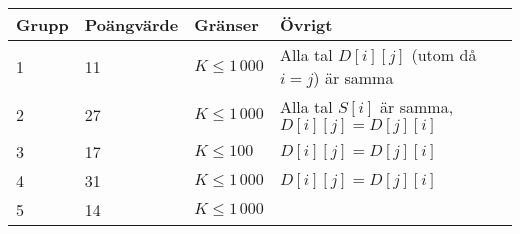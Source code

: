 \begin{tabular}{| l | l | l | l |}
\hline
Grupp & Poängvärde & Gränser & Övrigt \\ \hline
	1     & 11         & $K \le 1\,000$ & Alla tal $D[i][j]$ (utom då $i = j$) är samma \\ \hline
	2     & 27         & $K \le 1\,000$ & Alla tal $S[i]$ är samma, $D[i][j] = D[j][i]$\\ \hline
	3     & 17         & $K \le 100$ & $D[i][j] = D[j][i]$ \\ \hline
	4     & 31         & $K \le 1\,000$ & $D[i][j] = D[j][i]$ \\ \hline
	5     & 14         & $K \le 1\,000$ & \\ \hline
\end{tabular}
